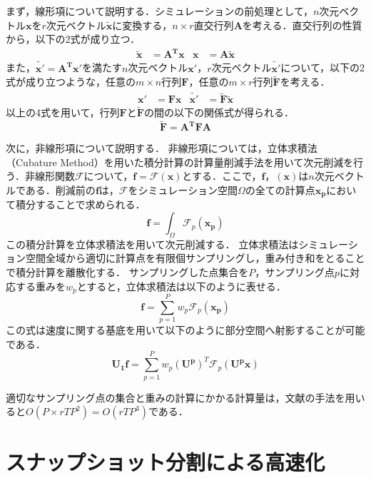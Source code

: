 \documentclass[uplatex,dvipdfmx,10pt,a4paper,notitlepage,oneside,twocolumn]{abst_jsarticle}
\begin{document}
まず，線形項について説明する．シミュレーションの前処理として，$n$次元ベクトル$\bm{x}$を$r$次元ベクトル$\bm{\tilde{x}} $に変換する，$n \times r$直交行列$\bm{A}$を考える．直交行列の性質から，以下の2式が成り立つ．
 	\begin{align*}
 		\bm{\tilde{x}}  		&= \bm{A^T}\bm{x}		&\bm{x} 			&= \bm{A}\bm{\tilde{x}}
	\end{align*}
	また，$\bm{\tilde{x'}}  = \bm{A^T}\bm{x'}$を満たす$n$次元ベクトル$\bm{x'}$，$r$次元ベクトル$\bm{\tilde{x'}} $について，以下の2式が成り立つような，任意の$m \times n$行列$\bm{F}$，任意の$m \times r$行列$\bm{\tilde{F}}$を考える．
	 \begin{align*}
		\bm{x'} 			&= \bm{F}\bm{x}		&\bm{\tilde{x'}} 		&= \bm{\tilde{F}}\bm{\tilde{x}} 
	\end{align*}
	以上の4式を用いて，行列$\bm{F}$と$\bm{\tilde{F}}$の間の以下の関係式が得られる．
	\[
	\bm{\tilde{F}} = \bm{A^T}\bm{F}\bm{A}
	\]

次に，非線形項について説明する．
非線形項については，立体求積法（Cubature Method）を用いた積分計算の計算量削減手法を用いて次元削減を行う．非線形関数$\mathcal{F}$について，$\bm{f} = \mathcal{F}(\bm{x})$とする．ここで，$\bm{f}$，$(\bm{x})$は$n$次元ベクトルである．削減前の$\bm{f}$は，$\mathcal{F}$をシミュレーション空間$\Omega$の全ての計算点$\bm{x_p}$において積分することで求められる．
\[
	\bm{f} = \int_\Omega\mathcal{F}_p(\bm{x_p})
\]
この積分計算を立体求積法を用いて次元削減する．
立体求積法はシミュレーション空間全域から適切に計算点を有限個サンプリングし，重み付き和をとることで積分計算を離散化する．
サンプリングした点集合を$P$，サンプリング点$p$に対応する重みを$w_p$とすると，立体求積法は以下のように表せる．
\[
	\bm{f} = \sum_{p=1}^Pw_p\mathcal{F}_p(\bm{x_p})
\]
この式は速度に関する基底を用いて以下のように部分空間へ射影することが可能である．
\[
	\bm{U_1}\bm{f} = \sum_{p=1}^Pw_p(\bm{U^p})^T\mathcal{F}_p(\bm{U^p}\bm{x})
\]

適切なサンプリング点の集合と重みの計算にかかる計算量は，文献\cite{subspace}の手法を用いると$O(P\times rTP^2) = O(rTP^3)$である．
\section{スナップショット分割による高速化}
\end{document}
